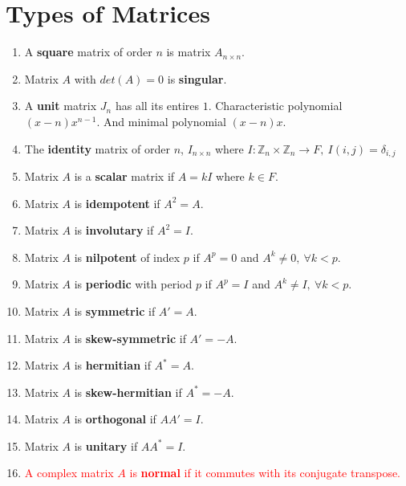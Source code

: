 \section{Types of Matrices}
\begin{enumerate}
	\item A \textbf{square} matrix of order $n$ is matrix $A_{n \times n}$.
	\item Matrix $A$ with $det(A) = 0$ is \textbf{singular}.
	\item A \textbf{unit} matrix $J_n$ has all its entires $1$.
		\subitem Characteristic polynomial $(x-n)x^{n-1}$. And minimal polynomial $(x-n)x$.
	\item The \textbf{identity} matrix of order $n$, $I_{n \times n}$ where $I : \mathbb{Z}_n \times \mathbb{Z}_n \to F,\ I(i,j) = \delta_{i,j}$
	\item Matrix $A$ is a \textbf{scalar} matrix if $A = kI$ where $k \in F$.
	\item Matrix $A$ is \textbf{idempotent} if $A^2 = A$.
	\item Matrix $A$ is \textbf{involutary} if $A^2 = I$.
	\item Matrix $A$ is \textbf{nilpotent} of index $p$ if $A^p = 0$ and $A^k \ne 0,\ \forall k < p$.
	\item Matrix $A$ is \textbf{periodic} with period $p$ if $A^p = I$ and $A^k \ne I,\ \forall k < p$.
	\item Matrix $A$ is \textbf{symmetric} if $A'=A$.
	\item Matrix $A$ is \textbf{skew-symmetric} if $A'=-A$.
	\item Matrix $A$ is \textbf{hermitian} if $A^\ast = A$.
	\item Matrix $A$ is \textbf{skew-hermitian} if $A^\ast = -A$.
	\item Matrix $A$ is \textbf{orthogonal} if $AA' = I$.
	\item Matrix $A$ is \textbf{unitary} if $AA^\ast = I$.
	\item \textcolor{red}{A complex matrix $A$ is \textbf{normal} if it commutes with its conjugate transpose.}
\end{enumerate}

